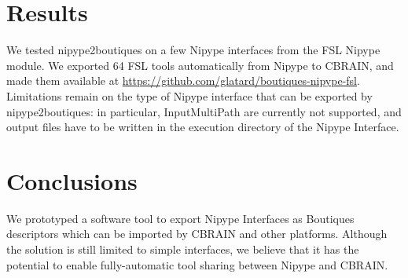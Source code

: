 \documentclass[twocolumn]{bmcart}%
\begin{document}
\section{Results}\label{results}

We tested nipype2boutiques on a few Nipype interfaces from the FSL
Nipype module. We exported 64 FSL tools automatically from Nipype to
CBRAIN, and made them available at
\url{https://github.com/glatard/boutiques-nipype-fsl}. Limitations
remain on the type of Nipype interface that can be exported by
nipype2boutiques: in particular, InputMultiPath are currently not
supported, and output files have to be written in the execution
directory of the Nipype Interface.

\section{Conclusions}\label{conclusions}

We prototyped a software tool to export Nipype Interfaces as Boutiques
descriptors which can be imported by CBRAIN and other platforms.
Although the solution is still limited to simple interfaces, we believe
that it has the potential to enable fully-automatic tool sharing between
Nipype and CBRAIN.

\end{document}
